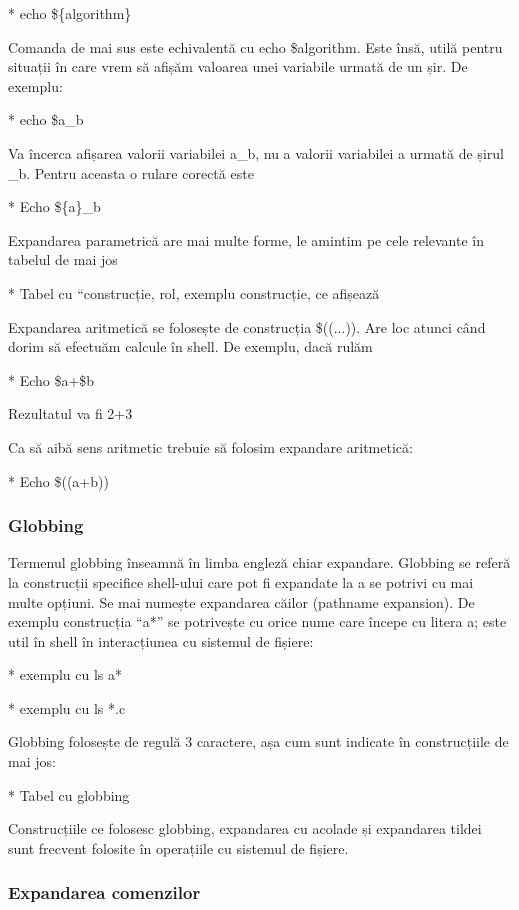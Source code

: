 * echo \$\{algorithm\}

Comanda de mai sus este echivalentă cu echo \$algorithm. Este însă, utilă pentru
situații în care vrem să afișăm valoarea unei variabile urmată de un șir. De
exemplu:

* echo \$a_b

Va încerca afișarea valorii variabilei a_b, nu a valorii variabilei a urmată de
șirul _b. Pentru aceasta o rulare corectă este

* Echo \$\{a\}_b

Expandarea parametrică are mai multe forme, le amintim pe cele relevante în
tabelul de mai jos

* Tabel cu “construcție, rol, exemplu construcție, ce afișează

Expandarea aritmetică se folosește de construcția \$((...)). Are loc atunci când
dorim să efectuăm calcule în shell. De exemplu, dacă rulăm

* Echo \$a+\$b

Rezultatul va fi 2+3

Ca să aibă sens aritmetic trebuie să folosim expandare aritmetică:

* Echo \$((a+b))

\subsubsection{Globbing}
\label{sec:cli-globbing}

Termenul globbing înseamnă în limba engleză chiar expandare. Globbing se referă
la construcții specifice shell-ului care pot fi expandate la a se potrivi cu mai
multe opțiuni. Se mai numește expandarea căilor (pathname expansion). De exemplu
construcția “a*” se potrivește cu orice nume care începe cu litera a; este util
în shell în interacțiunea cu sistemul de fișiere:

* exemplu cu ls a*

* exemplu cu ls *.c

Globbing folosește de regulă 3 caractere, așa cum sunt indicate în construcțiile
de mai jos:

* Tabel cu globbing

Construcțiile ce folosesc globbing, expandarea cu acolade și expandarea tildei
sunt frecvent folosite în operațiile cu sistemul de fișiere.

\subsubsection{Expandarea comenzilor}
\label{sec:cli-comm-expansion}

